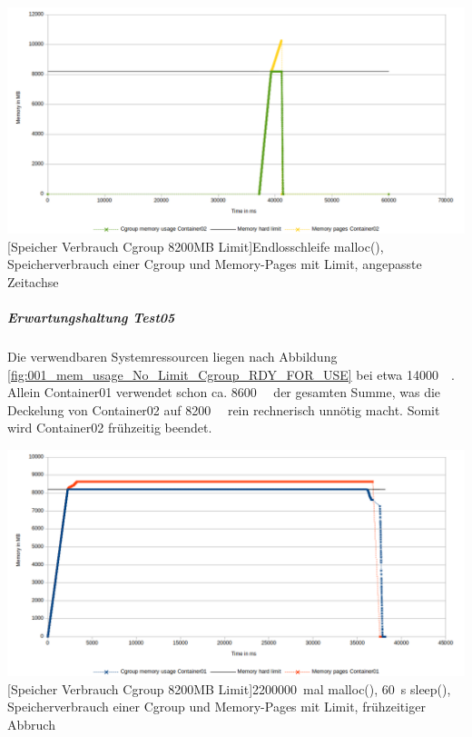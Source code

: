 \vspace{1em}
\begin{minipage}{\linewidth}
	\centering
	\includegraphics[width=1\linewidth]{pics/005_mem_usage_8200mb_limit_Container02_Basis_RDY_FOR_USE_FOCUS.png}
	[Speicher Verbrauch Cgroup 8200MB Limit]{Endlosschleife malloc(), Speicherverbrauch einer Cgroup und Memory-Pages mit Limit, angepasste Zeitachse}
	\label{fig:005_mem_usage_8200mb_limit_Container02_Basis_RDY_FOR_USE_FOCUS}
\end{minipage}

\subparagraph{Erwartungshaltung Test05}
Die verwendbaren Systemressourcen liegen nach Abbildung \ref{fig:001_mem_usage_No_Limit_Cgroup_RDY_FOR_USE} bei etwa \SI{14000}{\mega\byte}. Allein Container01 verwendet schon ca. \SI{8600}{\mega\byte} der gesamten Summe, was die Deckelung von Container02 auf \SI{8200}{\mega\byte} rein rechnerisch unnötig macht. Somit wird Container02 frühzeitig beendet. 

\vspace{1em}
\begin{minipage}{\linewidth}
	\centering
	\includegraphics[width=1\linewidth]{pics/006_mem_usage_8200mb_limit_Container01_mit_ipact_RDY_FOR_USE.png}
	[Speicher Verbrauch Cgroup 8200MB Limit]{\SI{2200000}{mal} malloc(), \SI{60}{\second} sleep(), Speicherverbrauch einer Cgroup und Memory-Pages mit Limit, frühzeitiger Abbruch}
	\label{fig:006_mem_usage_8200mb_limit_Container01_mit_ipact_RDY_FOR_USE}
\end{minipage}

